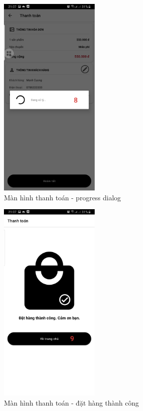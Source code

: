 \documentclass[12pt]{article}
\begin{document}
\begin{figure}[H]
    \centering
    \includegraphics[height=10cm]{images/32.png}
    \caption{Màn hình thanh toán - progress dialog}
\end{figure}

\begin{figure}[H]
    \centering
    \includegraphics[height=10cm]{images/33.png}
    \caption{Màn hình thanh toán - đặt hàng thành công}
\end{figure}
\end{document}

